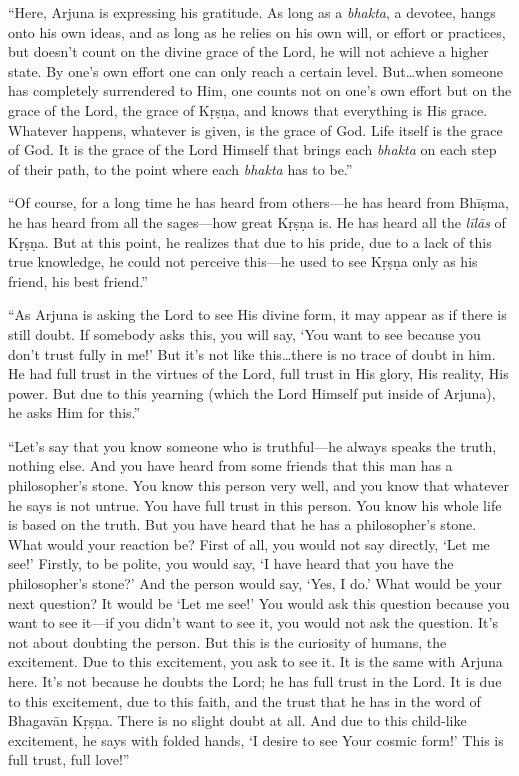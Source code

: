 \documentclass[12pt, twoside, openright]{memoir}
\begin{document}
\enquote{Here, Arjuna is expressing his gratitude. As long as a \textit{bhakta}, a devotee, hangs onto his own ideas, and as long as he relies on his own will, or effort or practices, but doesn’t count on the divine grace of the Lord, he will not achieve a higher state. By one’s own effort one can only reach a certain level. But\ldots when someone has completely surrendered to Him, one counts not on one’s own effort but on the grace of the Lord, the grace of Kṛṣṇa, and knows that everything is His grace. Whatever happens, whatever is given, is the grace of God. Life itself is the grace of God. It is the grace of the Lord Himself that brings each \textit{bhakta} on each step of their path, to the point where each \textit{bhakta} has to be.}

\enquote{Of course, for a long time he has heard from others---he has heard from Bhīṣma, he has heard from all the sages---how great Kṛṣṇa is. He has heard all the \textit{līlās} of Kṛṣṇa. But at this point, he realizes that due to his pride, due to a lack of this true knowledge, he could not perceive this---he used to see Kṛṣṇa only as his friend, his best friend.}

\enquote{As Arjuna is asking the Lord to see His divine form, it may appear as if there is still doubt. If somebody asks this, you will say, \enquote{You want to see because you don’t trust fully in me!} But it’s not like this\ldots there is no trace of doubt in him. He had full trust in the virtues of the Lord, full trust in His glory, His reality, His power. But due to this yearning (which the Lord Himself put inside of Arjuna), he asks Him for this.}

\enquote{Let’s say that you know someone who is truthful---he always speaks the truth, nothing else. And you have heard from some friends that this man has a philosopher’s stone. You know this person very well, and you know that whatever he says is not untrue. You have full trust in this person. You know his whole life is based on the truth. But you have heard that he has a philosopher’s stone. What would your reaction be? First of all, you would not say directly, \enquote{Let me see!} Firstly, to be polite, you would say, \enquote{I have heard that you have the philosopher’s stone?} And the person would say, \enquote{Yes, I do.} What would be your next question? It would be \enquote{Let me see!} You would ask this question because you want to see it---if you didn’t want to see it, you would not ask the question. It’s not about doubting the person. But this is the curiosity of humans, the excitement. Due to this excitement, you ask to see it. It is the same with Arjuna here. It’s not because he doubts the Lord; he has full trust in the Lord. It is due to this excitement, due to this faith, and the trust that he has in the word of Bhagavān Kṛṣṇa. There is no slight doubt at all. And due to this child-like excitement, he says with folded hands, \enquote{I desire to see Your cosmic form!} This is full trust, full love!}
\end{document}
